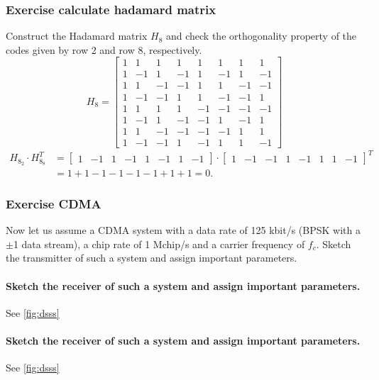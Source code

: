 \subsubsection{Exercise calculate hadamard matrix}
Construct the Hadamard matrix $H_8$ and check the orthogonality property of the codes given by row 2 and row 8, respectively.
$$
H_8=\left[\begin{array}{cccccccc}
1 & 1 & 1 & 1 & 1 & 1 & 1 & 1 \\
1 & -1 & 1 & -1 & 1 & -1 & 1 & -1 \\
1 & 1 & -1 & -1 & 1 & 1 & -1 & -1 \\
1 & -1 & -1 & 1 & 1 & -1 & -1 & 1 \\
1 & 1 & 1 & 1 & -1 & -1 & -1 & -1 \\
1 & -1 & 1 & -1 & -1 & 1 & -1 & 1 \\
1 & 1 & -1 & -1 & -1 & -1 & 1 & 1 \\
1 & -1 & -1 & 1 & -1 & 1 & 1 & -1
\end{array}\right]
$$
\begin{equation}\label{eq:hardamard_test}
\begin{aligned}
H_{8_2} \cdot H_{8_8}^T & =\left[\begin{array}{llllllll}
1 & -1 & 1 & -1 & 1 & -1 & 1 & -1
\end{array}\right] \cdot\left[\begin{array}{llllllll}
1 & -1 & -1 & 1 & -1 & 1 & 1 & -1
\end{array}\right]^T \\
& =1+1-1-1-1-1+1+1=0 .
\end{aligned}
\end{equation}
\subsubsection{Exercise CDMA}
Now let us assume a CDMA system with a data rate of 125 kbit/s (BPSK with a $\pm $1 data stream), a chip rate of 1 Mchip/s and a carrier frequency of $f_c$. Sketch the transmitter of such a system and assign important parameters.
\paragraph{Sketch the receiver of such a system and assign important parameters.}\mbox{} \newline
See \autoref{fig:dsss}
\paragraph{Sketch the receiver of such a system and assign important parameters.}\mbox{} \newline
See \autoref{fig:dsss}
